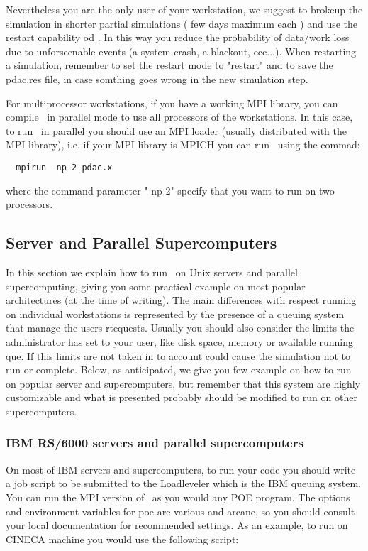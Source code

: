 Nevertheless you are the only user of your workstation,
we suggest to brokeup the simulation in shorter partial
simulations ( few days maximum each ) and use the
restart capability od \PDAC. In this way you 
reduce the probability of data/work loss due to 
unforseenable events (a system crash, a blackout, ecc...).
When restarting a simulation, remember to set the 
restart mode to "restart" and to save the pdac.res file,
in case somthing goes wrong in the new simulation step.

For multiprocessor workstations, if you have a working MPI
library, you can compile \PDAC\ in parallel mode to use
all processors of the workstations. In this case,
to run \PDAC\ in parallel you should use an MPI loader 
(usually distributed with the MPI library), i.e. if
your MPI library is MPICH you can run \PDAC\ using the commad:

\begin{verbatim}
  mpirun -np 2 pdac.x
\end{verbatim}

where the command parameter "-np 2" specify that you want
to run on two processors.

\subsection{Server and Parallel Supercomputers}

In this section we explain how to run \PDAC\ on Unix servers
and parallel supercomputing, giving you some practical example
on most popular architectures (at the time of writing).
The main differences with respect running on individual workstations
is represented by the presence of a queuing system that
manage the users rtequests. Usually you should also 
consider the limits the administrator has set to your user,
like disk space, memory or available running que. 
If this limits are not taken in to account could cause
the simulation not to run or complete.
Below, as anticipated, we give you few example on how to run
on popular server and supercomputers, but remember that 
this system are highly customizable and what is presented 
probably should be modified to run on other supercomputers.

\subsubsection{IBM RS/6000 servers and parallel supercomputers}

On most of IBM servers and supercomputers, to run your code you
should write a job script to be submitted to the Loadleveler which
is the IBM queuing system.
You can run the MPI version of \PDAC\ as you would any POE program.  
The options and environment variables for poe are various and arcane, 
so you should consult your local documentation for recommended settings.  
As an example, to run on CINECA machine you would use the following script:

